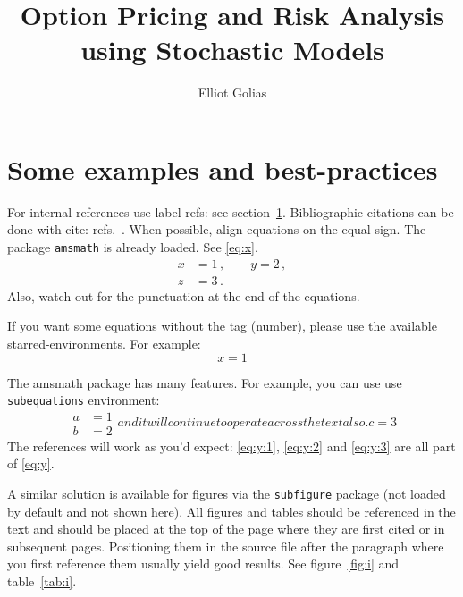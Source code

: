 \documentclass[a4paper,11pt]{article}
\title{\boldmath Option Pricing and Risk Analysis using Stochastic Models}
\author{Elliot Golias}
\begin{document}
 
\maketitle
\flushbottom

\section{Some examples and best-practices}
\label{sec:intro}

For internal references use label-refs: see section~\ref{sec:intro}.
Bibliographic citations can be done with cite: refs.~\cite{a,b,c}.
When possible, align equations on the equal sign. The package
\texttt{amsmath} is already loaded. See \eqref{eq:x}.
\begin{equation}
\label{eq:x}
\begin{split}
x &= 1 \,,
\qquad
y = 2 \,,
\\
z &= 3 \,.
\end{split}
\end{equation}
Also, watch out for the punctuation at the end of the equations.


If you want some equations without the tag (number), please use the available
starred-environments. For example:
\begin{equation*}
x = 1
\end{equation*}

The amsmath package has many features. For example, you can use use
\texttt{subequations} environment:
\begin{subequations}\label{eq:y}
\begin{align}
\label{eq:y:1}
a & = 1
\\
\label{eq:y:2}
b & = 2
\end{align}
and it will continue to operate across the text also.
\begin{equation}
\label{eq:y:3}
c = 3
\end{equation}
\end{subequations}
The references will work as you'd expect: \eqref{eq:y:1},
\eqref{eq:y:2} and \eqref{eq:y:3} are all part of \eqref{eq:y}.

A similar solution is available for figures via the \texttt{subfigure}
package (not loaded by default and not shown here). 
All figures and tables should be referenced in the text and should be
placed at the top of the page where they are first cited or in
subsequent pages. Positioning them in the source file
after the paragraph where you first reference them usually yield good
results. See figure~\ref{fig:i} and table~\ref{tab:i}.
\end{document}
